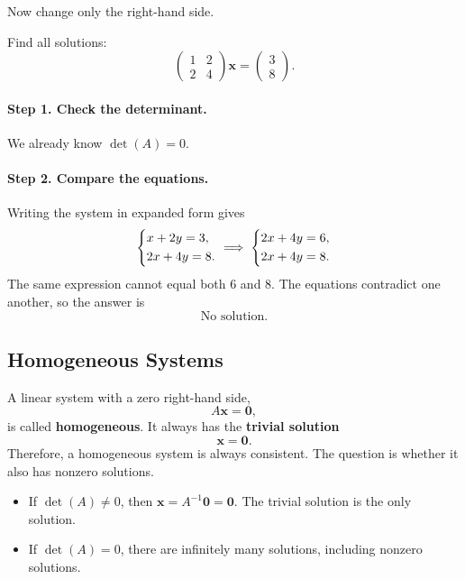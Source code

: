 \documentclass[10pt,letterpaper]{article}
\begin{document}
Now change only the right-hand side.

\begin{example}[9]{
Find all solutions:
\[
\begin{pmatrix}
1&2\\
2&4
\end{pmatrix}
\mathbf{x}
=
\begin{pmatrix}3\\8\end{pmatrix}.
\]
}
\paragraph{Step 1. Check the determinant.} We already know $\det(A)=0$.
\paragraph{Step 2. Compare the equations.}
Writing the system in expanded form gives
\[
\begin{dcases}
x+2y=3,\\
2x+4y=8.
\end{dcases} \implies 
\begin{dcases}
2x+4y=6,\\
2x+4y=8.
\end{dcases} 
\]
The same expression cannot equal both $6$ and $8$.
The equations contradict one another, so the answer is
\[
\boxed{\text{No solution.}}
\]

\end{example}
\subsection{Homogeneous Systems}

A linear system with a zero right-hand side,
\[
A\mathbf{x}=\mathbf{0},
\]
is called \textbf{homogeneous}. It always has the
\textbf{trivial solution}
\[
\mathbf{x}=\mathbf{0}.
\]
Therefore, a homogeneous system is always consistent.
The question is whether it also has nonzero solutions.
\begin{itemize}
    \item If $\det(A)\ne0$, then
    $\mathbf{x}=A^{-1}\mathbf{0}=\mathbf{0}$.
    The trivial solution is the only solution.

    \item If $\det(A)=0$, there are infinitely many
    solutions, including nonzero solutions.
\end{itemize}
\end{document}
